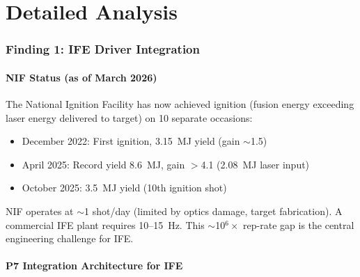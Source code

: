 \documentclass[11pt]{article}
\begin{document}
\part{Detailed Analysis}
\label{part:detail}

\section{Finding 1: IFE Driver Integration}
\label{sec:ife}

\subsection{NIF Status (as of March 2026)}

The National Ignition Facility has now achieved ignition (fusion energy
exceeding laser energy delivered to target) on 10 separate occasions:
\begin{itemize}[nosep]
  \item December 2022: First ignition, 3.15~MJ yield (gain $\sim$1.5)
  \item April 2025: Record yield 8.6~MJ, gain $>$4.1 (2.08~MJ laser input)
  \item October 2025: 3.5~MJ yield (10th ignition shot)
\end{itemize}

NIF operates at $\sim$1 shot/day (limited by optics damage, target
fabrication). A commercial IFE plant requires 10--15~Hz. This
$\sim$10$^6\times$ rep-rate gap is the central engineering challenge
for IFE.

\subsection{P7 Integration Architecture for IFE}
\end{document}
